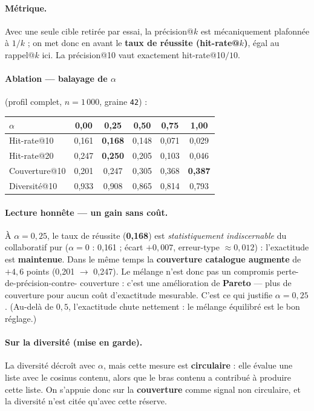 \documentclass[11pt,a4paper]{article}
\begin{document}
\paragraph{Métrique.} Avec une seule cible retirée par essai, la précision@$k$
est mécaniquement plafonnée à $1/k$ ; on met donc en avant le \textbf{taux de
réussite (hit-rate@$k$)}, égal au rappel@$k$ ici. La précision@10 vaut
exactement hit-rate@10$/10$.

\paragraph{Ablation — balayage de $\alpha$} (profil complet, $n=1\,000$,
graine \texttt{42}) :

\begin{center}
\begin{tabular}{lccccc}
\toprule
$\alpha$ & 0{,}00 & \textbf{0{,}25} & 0{,}50 & 0{,}75 & 1{,}00 \\
\midrule
Hit-rate@10   & 0{,}161 & \textbf{0{,}168} & 0{,}148 & 0{,}071 & 0{,}029 \\
Hit-rate@20   & 0{,}247 & \textbf{0{,}250} & 0{,}205 & 0{,}103 & 0{,}046 \\
Couverture@10 & 0{,}201 & 0{,}247 & 0{,}305 & 0{,}368 & \textbf{0{,}387} \\
Diversité@10  & 0{,}933 & 0{,}908 & 0{,}865 & 0{,}814 & 0{,}793 \\
\bottomrule
\end{tabular}
\end{center}

\paragraph{Lecture honnête — un gain sans coût.} À $\alpha=0{,}25$, le taux de
réussite (\textbf{0{,}168}) est \emph{statistiquement indiscernable} du
collaboratif pur ($\alpha=0$ : 0{,}161 ; écart $+0{,}007$, erreur-type
$\approx 0{,}012$) : l'exactitude est \textbf{maintenue}. Dans le même temps la
\textbf{couverture catalogue augmente} de $+4{,}6$ points (0{,}201 $\rightarrow$
0{,}247). Le mélange n'est donc pas un compromis perte-de-précision-contre-
couverture : c'est une amélioration de \textbf{Pareto} — plus de couverture pour
aucun coût d'exactitude mesurable. C'est ce qui justifie $\alpha=0{,}25$. (Au-delà
de $0{,}5$, l'exactitude chute nettement : le mélange équilibré est le bon réglage.)

\paragraph{Sur la diversité (mise en garde).} La diversité décroît avec $\alpha$,
mais cette mesure est \textbf{circulaire} : elle évalue une liste avec le cosinus
contenu, alors que le bras contenu a contribué à produire cette liste. On
s'appuie donc sur la \textbf{couverture} comme signal non circulaire, et la
diversité n'est citée qu'avec cette réserve.
\end{document}
